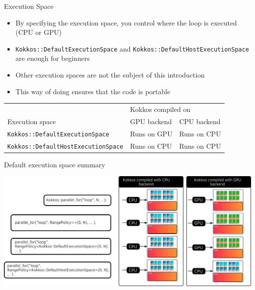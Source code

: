 \documentclass[aspectratio=169]{beamer}
\begin{document}
\begin{frame}{Execution Space}
    \begin{itemize}
        \item By specifying the execution space, you control where the loop is executed (CPU or GPU)
        \item \texttt{Kokkos::DefaultExecutionSpace} and \texttt{Kokkos::DefaultHostExecutionSpace} are enough for beginners
        \item Other execution spaces are not the subject of this introduction
        \item This way of doing ensures that the code is portable
    \end{itemize}
    \begin{center}
        \begin{tabular}{lll}
            & \multicolumn{2}{l}{Kokkos compiled on} \\
            Execution space & GPU backend & CPU backend \\
            \texttt{Kokkos::DefaultExecutionSpace} & Runs on GPU & Runs on CPU \\
            \texttt{Kokkos::DefaultHostExecutionSpace} & Runs on CPU & Runs on CPU \\
        \end{tabular}
    \end{center}
\end{frame}


\begin{frame}{Default execution space summary}
    \begin{center}
        \includegraphics[width=\textwidth]{default_execution_space.png}
    \end{center}
\end{frame}

\end{document}
